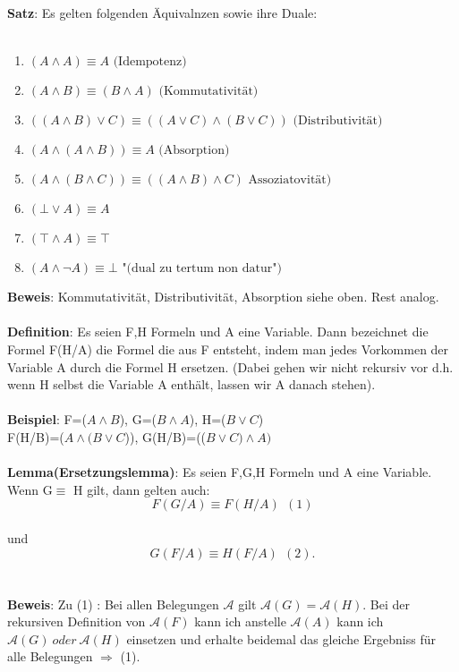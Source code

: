 \documentclass[a4paper]{scrartcl}
\begin{document}
\textbf{Satz}: Es gelten folgenden Äquivalnzen sowie ihre Duale:\\ \\
\begin{enumerate}
\item $(A\land A ) \equiv A \text{~(Idempotenz)}$
\item $(A\land B) \equiv (B \land A) \text{~(Kommutativität)}$
\item $((A\land B) \lor C) \equiv ((A \lor C ) \land (B\lor C)) \text{~(Distributivität)}$
\item $(A \land (A \land B )) \equiv A \text{~(Absorption)}$
\item $(A \land (B \land C )) \equiv ((A\land B ) \land C) \text{~Assoziatovität)}$
\item $(\bot \lor A) \equiv A$ 
\item $(\top \land A) \equiv \top$
\item $(A \land \neg A) \equiv \bot \text{~"(dual zu tertum non datur")}$
\end{enumerate}
\textbf{Beweis}: Kommutativität, Distributivität, Absorption siehe oben. Rest analog.\\ \\
\textbf{Definition}: Es seien F,H Formeln und A eine Variable. Dann bezeichnet die Formel F(H/A) die Formel die aus F entsteht, indem man jedes Vorkommen der Variable A durch die Formel H ersetzen. (Dabei gehen wir nicht rekursiv vor d.h. wenn H selbst die Variable A enthält, lassen wir A danach stehen).\\ \\
\textbf{Beispiel}: F=($A\land B$), G=($B\land A$), H=($B\lor C$)\\
F(H/B)=($A\land (B\lor C$)), G(H/B)=(($B\lor C) \land A)$\\ \\
\textbf{Lemma(Ersetzungslemma)}: Es seien F,G,H Formeln und A eine Variable. Wenn G$\equiv$ H gilt, dann gelten auch:\\
$$F(G/A) \equiv F(H/A)~~(1)$$\\ und $$G(F/A) \equiv H(F/A)~~(2).$$\\ \\
\textbf{Beweis}: Zu (1) : Bei allen Belegungen $\mathcal{A}$ gilt $\mathcal{A}(G)=\mathcal{A}(H)$. Bei der rekursiven Definition von $\mathcal{A}(F)$ kann ich anstelle $\mathcal{A}(A)$ kann ich $\mathcal{A}(G)~oder~\mathcal{A}(H)$ einsetzen und erhalte beidemal das gleiche Ergebniss für alle Belegungen $\Rightarrow$ (1).\\
\end{document}
